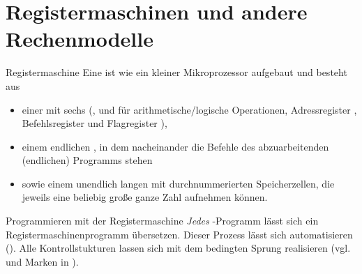 \addtocounter{subsection}{4}

\section{%
    Registermaschinen und andere Rechenmodelle%
}

\begin{Def}{Registermaschine}
    Eine  ist wie ein kleiner Mikroprozessor
    aufgebaut und besteht aus
    \begin{itemize}
        \item einer  mit sechs 
        (,  und  für
        arithmetische/logische Operationen,
        Adressregister , Befehlsregister 
        und Flagregister ),

        \item einem endlichen , in dem nacheinander
        die Befehle
        des abzuarbeitenden (endlichen) Programms stehen

        \item sowie einem unendlich langen  mit
        durchnummerierten Speicherzellen, die jeweils eine beliebig große ganze
        Zahl aufnehmen können.
    \end{itemize}
\end{Def}

\begin{Def}{Programmieren mit der Registermaschine}
    \emph{Jedes} \Ada{}-Programm lässt sich ein Registermaschinenprogramm
    übersetzen.
    Dieser Prozess lässt sich automatisieren ().
    Alle Kontrollstukturen lassen sich mit dem bedingten Sprung
     realisieren (vgl.  und Marken in \Ada{}).
\end{Def}

\pagebreak


